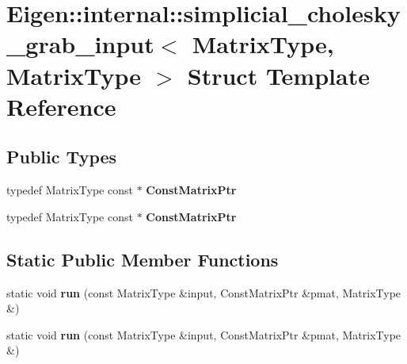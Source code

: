 \hypertarget{struct_eigen_1_1internal_1_1simplicial__cholesky__grab__input_3_01_matrix_type_00_01_matrix_type_01_4}{}\section{Eigen\+:\+:internal\+:\+:simplicial\+\_\+cholesky\+\_\+grab\+\_\+input$<$ Matrix\+Type, Matrix\+Type $>$ Struct Template Reference}
\label{struct_eigen_1_1internal_1_1simplicial__cholesky__grab__input_3_01_matrix_type_00_01_matrix_type_01_4}
\subsection*{Public Types}
\begin{DoxyCompactItemize}
\item 
\mbox{\label{struct_eigen_1_1internal_1_1simplicial__cholesky__grab__input_3_01_matrix_type_00_01_matrix_type_01_4_a7cd687af3b3232d252dc00c646ed6f67}} 
typedef Matrix\+Type const  $\ast$ {\bfseries Const\+Matrix\+Ptr}
\item 
\mbox{\label{struct_eigen_1_1internal_1_1simplicial__cholesky__grab__input_3_01_matrix_type_00_01_matrix_type_01_4_a7cd687af3b3232d252dc00c646ed6f67}} 
typedef Matrix\+Type const  $\ast$ {\bfseries Const\+Matrix\+Ptr}
\end{DoxyCompactItemize}
\subsection*{Static Public Member Functions}
\begin{DoxyCompactItemize}
\item 
\mbox{\label{struct_eigen_1_1internal_1_1simplicial__cholesky__grab__input_3_01_matrix_type_00_01_matrix_type_01_4_a56ae7a93a8b10ca64e27abf1cdaa4542}} 
static void {\bfseries run} (const Matrix\+Type \&input, Const\+Matrix\+Ptr \&pmat, Matrix\+Type \&)
\item 
\mbox{\label{struct_eigen_1_1internal_1_1simplicial__cholesky__grab__input_3_01_matrix_type_00_01_matrix_type_01_4_a56ae7a93a8b10ca64e27abf1cdaa4542}} 
static void {\bfseries run} (const Matrix\+Type \&input, Const\+Matrix\+Ptr \&pmat, Matrix\+Type \&)
\end{DoxyCompactItemize}


